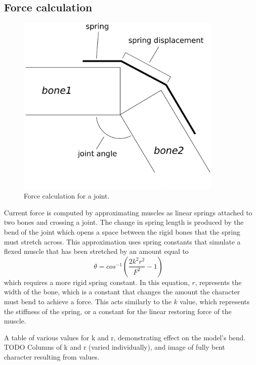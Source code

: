 \subsection{Force calculation}
\begin{figure}[ht]
	\label{fig:forceCalc}
	\centering
	\includegraphics[width=10cm]{images/spring_calc/spring_angle_calc.eps}
	\caption{Force calculation for a joint.}
\end{figure}
Current force is computed by approximating muscles as linear springs attached to two bones and crossing a joint.  The change in spring length is produced by the bend of the joint which opens a space between the rigid bones that the spring must stretch across.  This approximation uses spring constants that simulate a flexed muscle that has been stretched by an amount equal to \[\theta = cos^{-1} \left( \dfrac{2 k^2 r^2}{F^2} - 1 \right)\] which requires a more rigid spring constant.  In this equation, $r$, represents the width of the bone, which is a constant that changes the amount the character must bend to achieve a force.  This acts similarly to the $k$ value, which represents the stiffness of the spring, or a constant for the linear restoring force of the muscle.  
\begin{table}[ht]
	\label{tab:variedSpringValues}
	\centering
	\caption{A table of various values for k and r, demonstrating effect on the model's bend.  TODO Columns of k and r (varied individually), and image of fully bent character resulting from values.}
\end{table}

